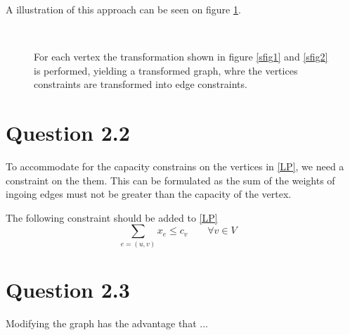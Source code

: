 \documentclass[10pt]{article}
\begin{document}
A illustration of this approach can be seen on figure \ref{fig1}.

\begin{figure}[ht]
\centering
\mbox{
     \quad
}                    
\caption{For each vertex the transformation shown in figure \ref{sfig1} and \ref{sfig2} is performed, yielding a transformed graph, whre the vertices constraints are transformed into edge constraints.}
\label{fig1}
\end{figure}



\section*{Question 2.2} %
\label{sec:question_2_2}
To accommodate for the capacity constrains on the vertices in \eqref{LP}, we need a constraint on the them.
This can be formulated as the sum of the weights of ingoing edges must not be greater than the capacity of the vertex.

The following constraint should be added to \eqref{LP}
\begin{equation}
	\sum_{e=(u,v)} x_e \leq c_v \qquad \forall v \in V \quad 
\end{equation} 

\section*{Question 2.3} %
\label{sec:question_2_3}
Modifying the graph has the advantage that ...
\end{document}
